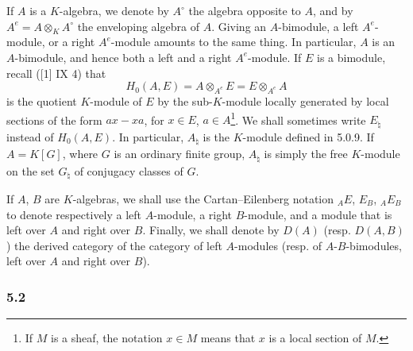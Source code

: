 \documentclass[11pt]{article}
\begin{document}
If $A$ is a $K$-algebra, we denote by $A^\circ$ the algebra opposite to $A$, and by $A^e=A\otimes_KA^\circ$ the enveloping algebra of $A$. Giving an $A$-bimodule, a left $A^e$-module, or a right $A^e$-module amounts to the same thing. In particular, $A$ is an $A$-bimodule, and hence both a left and a right $A^e$-module. If $E$ is a bimodule, recall ([1] IX 4) that
\[
H_0(A,E)=A\otimes_{A^e}E=E\otimes_{A^e}A
\]
is the quotient $K$-module of $E$ by the sub-$K$-module locally generated by local sections of the form $ax-xa$, for $x\in E$, $a\in A$\footnote{If $M$ is a sheaf, the notation $x\in M$ means that $x$ is a local section of $M$.}. We shall sometimes write $E_\natural$ instead of $H_0(A,E)$. In particular, $A_\natural$ is the $K$-module defined in 5.0.9. If $A=K[G]$, where $G$ is an ordinary finite group, $A_\natural$ is simply the free $K$-module on the set $G_\natural$ of conjugacy classes of $G$.

If $A$, $B$ are $K$-algebras, we shall use the Cartan--Eilenberg notation ${}_AE$, $E_B$, ${}_AE_B$ to denote respectively a left $A$-module, a right $B$-module, and a module that is left over $A$ and right over $B$. Finally, we shall denote by $D(A)$ (resp. $D(A,B)$) the derived category of the category of left $A$-modules (resp. of $A$-$B$-bimodules, left over $A$ and right over $B$).

\subsubsection*{5.2}
\end{document}

